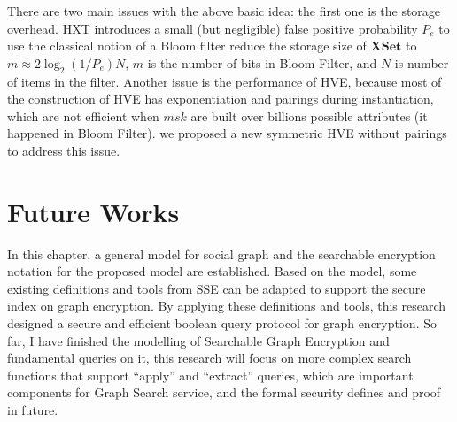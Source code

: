 There are two main issues with the above basic idea: the first one is the storage overhead. HXT introduces a small (but negligible) false positive probability $P_e$ to use the classical notion of a Bloom filter \cite{bloom1970space} reduce the storage size of $\mathbf{XSet}$ to $m \approx 2\log_2(1/P_e)N$, $m$ is the number of bits in Bloom Filter, and $N$ is number of items in the filter. Another issue is the performance of HVE, because most of the construction of HVE has exponentiation and pairings during instantiation, which are not efficient when $msk$ are built over billions possible attributes (it happened in Bloom Filter). we proposed a new symmetric HVE without pairings to address this issue.

\section{Future Works}
In this chapter, a general model for social graph and the searchable encryption notation for the proposed model are established. Based on the model, some existing definitions and tools from SSE can be adapted to support the secure index on graph encryption. By applying these definitions and tools, this research designed a secure and efficient boolean query protocol for graph encryption. So far, I have finished the modelling of Searchable Graph Encryption and fundamental queries on it, this research will focus on more complex search functions that support ``apply'' and ``extract'' queries, which are important components for Graph Search service, and the formal security defines and proof in future.


